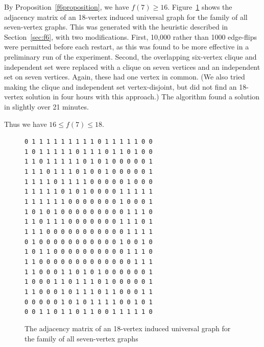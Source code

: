 By Proposition~\ref{f6proposition}, we have $f(7) \geq 16$.  Figure~\ref{fig:adjmat18}
shows the adjacency matrix of an 18-vertex induced universal
graph for the family of all seven-vertex graphs. This was generated with 
the heuristic described in Section~\ref{sec:f6}, with two modifications.
First, 10,000 rather than 1000
edge-flips were permitted before each restart, as this was found to be more effective
in a preliminary run of the experiment.  Second, the overlapping six-vertex clique
and independent set were replaced with a clique on seven vertices and an independent
set on seven vertices.  Again, these had one vertex in common.  (We also tried making
the clique and independent set vertex-disjoint, but did not find an 18-vertex solution
in four hours with this approach.)  The algorithm found a solution in slightly
over 21 minutes.

Thus we have $16 \leq f(7) \leq 18$.

\begin{figure}[htb]
\centering
\scriptsize
\verb|0 1 1 1 1 1 1 1 1 1 0 1 1 1 1 1 0 0| \\
\verb|1 0 1 1 1 1 1 0 1 1 1 0 1 1 0 1 0 0| \\
\verb|1 1 0 1 1 1 1 1 0 1 0 1 0 0 0 0 0 1| \\
\verb|1 1 1 0 1 1 1 0 1 0 0 1 0 0 0 0 0 1| \\
\verb|1 1 1 1 0 1 1 1 1 0 0 0 0 0 1 0 0 0| \\
\verb|1 1 1 1 1 0 1 0 1 0 0 0 0 1 1 1 1 1| \\
\verb|1 1 1 1 1 1 0 0 0 0 0 0 0 1 0 0 0 1| \\
\verb|1 0 1 0 1 0 0 0 0 0 0 0 0 0 1 1 1 0| \\
\verb|1 1 0 1 1 1 0 0 0 0 0 0 0 1 1 1 0 1| \\
\verb|1 1 1 0 0 0 0 0 0 0 0 0 0 0 1 1 1 1| \\
\verb|0 1 0 0 0 0 0 0 0 0 0 0 0 1 0 0 1 0| \\
\verb|1 0 1 1 0 0 0 0 0 0 0 0 0 0 1 1 1 0| \\
\verb|1 1 0 0 0 0 0 0 0 0 0 0 0 0 0 1 1 1| \\
\verb|1 1 0 0 0 1 1 0 1 0 1 0 0 0 0 0 0 1| \\
\verb|1 0 0 0 1 1 0 1 1 1 0 1 0 0 0 0 0 1| \\
\verb|1 1 0 0 0 1 0 1 1 1 0 1 1 0 0 0 1 1| \\
\verb|0 0 0 0 0 1 0 1 0 1 1 1 1 0 0 1 0 1| \\
\verb|0 0 1 1 0 1 1 0 1 1 0 0 1 1 1 1 1 0|
\caption{The adjacency matrix of an 18-vertex induced universal graph for the family of all
seven-vertex graphs}
\label{fig:adjmat18}
\end{figure}

